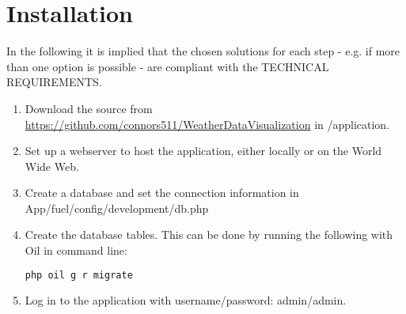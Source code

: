 \chapter{Installation}

In the following it is implied that the chosen solutions for each step - e.g. if more than one option is possible - are compliant with the TECHNICAL REQUIREMENTS.

\begin{enumerate}
\item Download the source from \url{https://github.com/connors511/WeatherDataVisualization} in \textsf{/application}.
\item Set up a webserver to host the application, either locally or on the World Wide Web.
\item Create a database and set the connection information in \textsf{App/fuel/config/development/db.php}
\item Create the database tables. This can be done by running the following with \textsf{Oil} in command line:
\begin{lstlisting}[language=sh]
php oil g r migrate
\end{lstlisting}
\item Log in to the application with username/password: \textsf{admin/admin}.
\end{enumerate}
